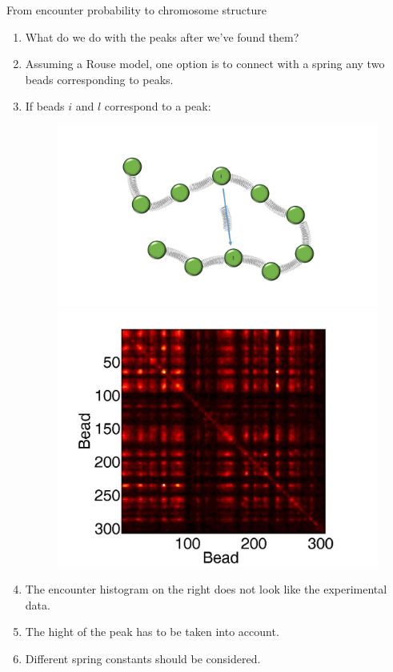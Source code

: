 \documentclass[8pt]{beamer}
\begin{document}
\begin{frame}{From encounter probability to chromosome structure}
\begin{enumerate}
\item What do we do with the peaks after we've found them?
\item Assuming a Rouse model, one option is to connect with a spring any two beads corresponding to peaks.
\item If beads $i$ and $l$ correspond to a peak: 
\begin{figure}[H]
\includegraphics[scale=0.15]{connectBeadsCorrespondingToPeaks}
\includegraphics[scale=0.07]{EncounterHistogramLoopsCorrespondingToPeaksExperimentalData}
\end{figure}
\item The encounter histogram on the right does not look like the experimental data. 
\item The hight of the peak has to be taken into account. 
\item Different spring constants should be considered.
\end{enumerate}
\end{frame}
\end{document}
